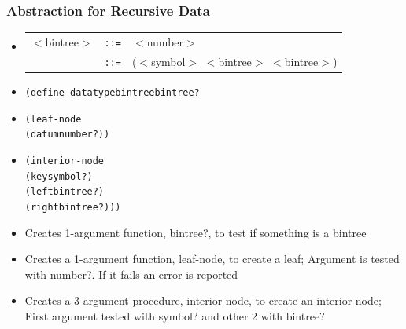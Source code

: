 \documentclass{beamer}
\newcommand{\is}{\texttt{::=}}
\begin{document}
\begin{frame}[fragile]
\frametitle{Abstraction for Recursive Data}
\begin{scriptsize}
\begin{itemize}
\item<1->
\begin{tabular}{lll}
   $<$bintree$>$ & \is{} & $<$number$>$ \\
         & \is{} & ($<$symbol$>$ $<$bintree$>$ $<$bintree$>$) \\
\end{tabular}

\item<2->
\begin{alltt}
(define-datatype bintree bintree?
\end{alltt}

\item<3->
\begin{alltt}
  (leaf-node
    (datum number?))
\end{alltt}

\item<4->
\begin{alltt}
  (interior-node
    (key symbol?)
    (left bintree?)
    (right bintree?)))
\end{alltt}

\item<5-> Creates 1-argument function, bintree?, to test if something is a bintree

\item<5-> Creates a 1-argument function, leaf-node, to create a leaf; Argument is tested with number?. If it fails an error is reported

\item<5-> Creates a 3-argument procedure, interior-node, to create an interior node; First argument tested with symbol? and other 2 with bintree?

\end{itemize}
\end{scriptsize}
\end{frame}
\end{document}
